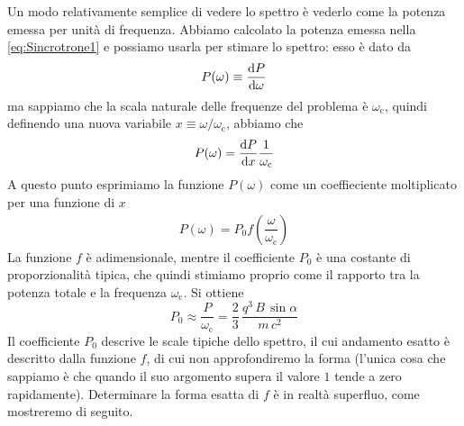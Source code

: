 Un modo relativamente semplice di vedere lo spettro è vederlo come la potenza emessa per unità di frequenza. Abbiamo calcolato la potenza emessa nella \ref{eq:Sincrotrone1} e possiamo usarla per stimare lo spettro: esso è dato da 
\begin{align*}
P(\omega) \equiv \dfrac{\mathrm{d} {P}}{\mathrm{d} {\omega}}
\end{align*}
ma sappiamo che la scala naturale delle frequenze del problema è $\omega_\mathrm{c}$, quindi definendo una nuova variabile $x\equiv \omega/\omega_\mathrm{c}$, abbiamo che 
\begin{align*}
P(\omega) = \dfrac{\mathrm{d} {P}}{\mathrm{d} {x}} \dfrac{1}{\omega_\mathrm{c}}
\end{align*}
A questo punto esprimiamo la funzione $P(\omega)$ come un coeffieciente moltiplicato per una funzione di $x$
\begin{align*}
P(\omega) = P_0 f\left(\dfrac{\omega}{\omega_\mathrm{c}}\right)
\end{align*}
La funzione $f$ è adimensionale, mentre il coefficiente $P_0$ è una costante di proporzionalità tipica, che quindi stimiamo proprio come il rapporto tra la potenza totale e la frequenza $\omega_\mathrm{c}$. Si ottiene
\begin{equation}
P_0 \approx \dfrac{P}{\omega_\mathrm{c}} = \dfrac{2}{3} \, \dfrac{q^3\,B\,\sin\alpha}{m\, c^2}
\end{equation}
Il coefficiente $P_0$ descrive le scale tipiche dello spettro, il cui andamento esatto è descritto dalla funzione $f$, di cui non approfondiremo la forma (l'unica cosa che sappiamo è che quando il suo argomento supera il valore $1$ tende a zero rapidamente). Determinare la forma esatta di $f$ è in realtà superfluo, come mostreremo di seguito.

